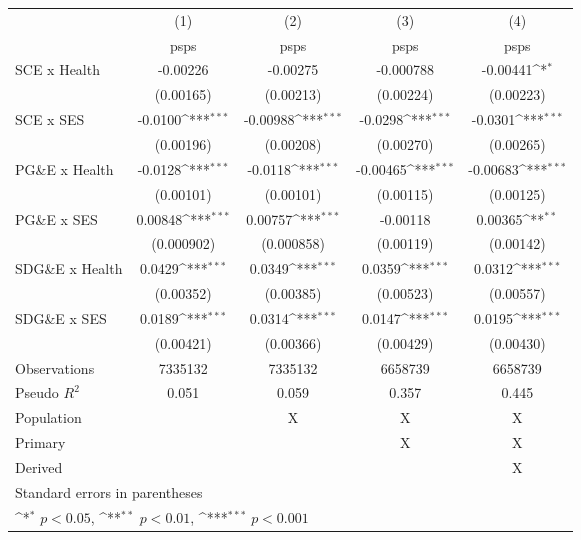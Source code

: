 {
\def\sym#1{\ifmmode^{#1}\else\(^{#1}\)\fi}
\begin{tabular}{l*{4}{c}}
\hline\hline
                    &\multicolumn{1}{c}{(1)}         &\multicolumn{1}{c}{(2)}         &\multicolumn{1}{c}{(3)}         &\multicolumn{1}{c}{(4)}         \\
                    &        psps         &        psps         &        psps         &        psps         \\
\hline
SCE x Health        &    -0.00226         &    -0.00275         &   -0.000788         &    -0.00441\sym{*}  \\
                    &   (0.00165)         &   (0.00213)         &   (0.00224)         &   (0.00223)         \\
[1em]
SCE x SES           &     -0.0100\sym{***}&    -0.00988\sym{***}&     -0.0298\sym{***}&     -0.0301\sym{***}\\
                    &   (0.00196)         &   (0.00208)         &   (0.00270)         &   (0.00265)         \\
[1em]
PG\&E x Health      &     -0.0128\sym{***}&     -0.0118\sym{***}&    -0.00465\sym{***}&    -0.00683\sym{***}\\
                    &   (0.00101)         &   (0.00101)         &   (0.00115)         &   (0.00125)         \\
[1em]
PG\&E x SES         &     0.00848\sym{***}&     0.00757\sym{***}&    -0.00118         &     0.00365\sym{**} \\
                    &  (0.000902)         &  (0.000858)         &   (0.00119)         &   (0.00142)         \\
[1em]
SDG\&E x Health     &      0.0429\sym{***}&      0.0349\sym{***}&      0.0359\sym{***}&      0.0312\sym{***}\\
                    &   (0.00352)         &   (0.00385)         &   (0.00523)         &   (0.00557)         \\
[1em]
SDG\&E x SES        &      0.0189\sym{***}&      0.0314\sym{***}&      0.0147\sym{***}&      0.0195\sym{***}\\
                    &   (0.00421)         &   (0.00366)         &   (0.00429)         &   (0.00430)         \\
\hline
Observations        &     7335132         &     7335132         &     6658739         &     6658739         \\
Pseudo \(R^{2}\)    &       0.051         &       0.059         &       0.357         &       0.445         \\
Population          &                     &           X         &           X         &           X         \\
Primary             &                     &                     &           X         &           X         \\
Derived             &                     &                     &                     &           X         \\
\hline\hline
\multicolumn{5}{l}{\footnotesize Standard errors in parentheses}\\
\multicolumn{5}{l}{\footnotesize \sym{*} \(p<0.05\), \sym{**} \(p<0.01\), \sym{***} \(p<0.001\)}\\
\end{tabular}
}
